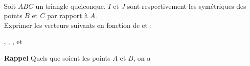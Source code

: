 \exercice ~\\

\begin{minipage}{0.22\textwidth}
	
\end{minipage}
\begin{minipage}{0.25\textwidth}
	Soit $ABC$ un triangle quelconque. $I$ et $J$ sont respectivement les symétriques des points $B$ et $C$ par rapport à $A$.\\

Exprimer les vecteurs suivants en fonction de  et  :
		
, , ,  et 

\end{minipage}

\textbf{Rappel} Quels que soient les points $A$ et $B$, on a 
